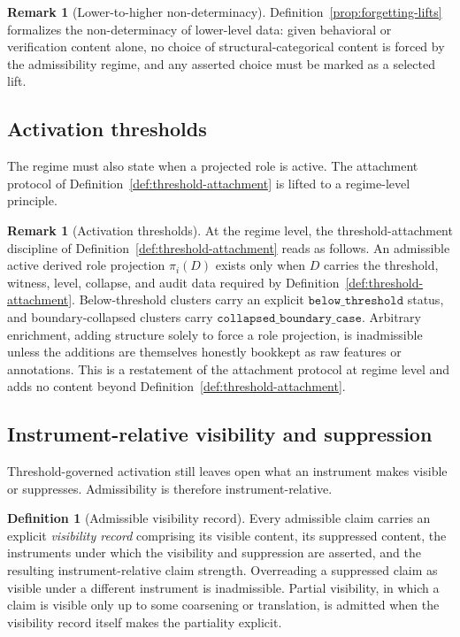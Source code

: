 \documentclass[11pt]{article}
\theoremstyle{definition}
\newtheorem{definition}[theorem]{Definition}
\newtheorem{remark}[theorem]{Remark}
\newcommand{\belowthr}{\texttt{below\_threshold}}
\newcommand{\collapsedbc}{\texttt{collapsed\_boundary\_case}}
\begin{document}
\begin{remark}[Lower-to-higher non-determinacy]\label{rem:lower-to-higher-non-determinacy}
Definition~\ref{prop:forgetting-lifts} formalizes the non-determinacy of
lower-level data: given behavioral or verification content alone, no
choice of structural-categorical content is forced by the admissibility
regime, and any asserted choice must be marked as a selected lift.
\end{remark}

\subsection{Activation thresholds}\label{subsec:activation-thresholds}

The regime must also state when a projected role is active. The
attachment protocol of Definition~\ref{def:threshold-attachment} is
lifted to a regime-level principle.

\begin{remark}[Activation thresholds]\label{prop:activation-thresholds}
At the regime level, the threshold-attachment discipline of
Definition~\ref{def:threshold-attachment} reads as follows. An
admissible active derived role projection \(\pi_i(D)\) exists only when
\(D\) carries the threshold, witness, level, collapse, and audit data
required by Definition~\ref{def:threshold-attachment}. Below-threshold
clusters carry an explicit \(\belowthr\) status, and boundary-collapsed
clusters carry \(\collapsedbc\). Arbitrary enrichment, adding structure
solely to force a role projection, is inadmissible unless the additions
are themselves honestly bookkept as raw features or annotations. This
is a restatement of the attachment protocol at regime level and adds no
content beyond Definition~\ref{def:threshold-attachment}.
\end{remark}

\subsection{Instrument-relative visibility and suppression}\label{subsec:visibility-suppression}

Threshold-governed activation still leaves open what an instrument
makes visible or suppresses. Admissibility is therefore
instrument-relative.

\begin{definition}[Admissible visibility record]\label{prop:visibility}
Every admissible claim carries an explicit \emph{visibility record}
comprising its visible content, its suppressed content, the instruments
under which the visibility and suppression are asserted, and the
resulting instrument-relative claim strength. Overreading a suppressed
claim as visible under a different instrument is inadmissible. Partial
visibility, in which a claim is visible only up to some coarsening or
translation, is admitted when the visibility record itself makes the
partiality explicit.
\end{definition}
\end{document}

